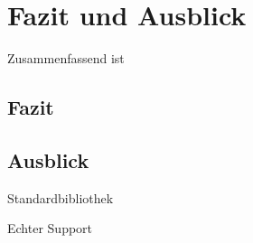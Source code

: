 \chapter{Fazit und Ausblick}\label{sec:conclusion}


Zusammenfassend ist 

\section{Fazit}

\section{Ausblick}

Standardbibliothek

Echter Support